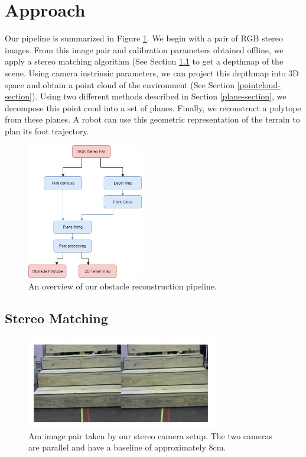 \section{Approach}

Our pipeline is summarized in Figure \ref{overview-diagram}. We begin with a pair of RGB stereo images. From this image pair and calibration parameters obtained offline, we apply a stereo matching algorithm (See Section \ref{stereo-matching-section} to get a depthmap of the scene. Using camera instrinsic parameters, we can project this depthmap into 3D space and obtain a point cloud of the environment (See Section \ref{pointcloud-section}). Using two different methods described in Section \ref{plane-section}, we decompose this point coud into a set of planes. Finally, we reconstruct a polytope from these planes. A robot can use this geometric representation of the terrain to plan its foot trajectory.


\begin{figure}[!h]
\centering
\includegraphics[width=2in]{Sections/Figures/Final-Project-Pipeline.png}
\caption{An overview of our obstacle reconstruction pipeline.}
\label{overview-diagram}
\end{figure}

\subsection{Stereo Matching} \label{stereo-matching-section}

\begin{figure}[!h]
\centering
\includegraphics[width=3.3in]{Sections/Figures/example_stereo_pair.jpg}
\caption{Am image pair taken by our stereo camera setup. The two cameras are parallel and have a baseline of approximately 8cm.}
\label{stereo-image-pair}
\end{figure}

